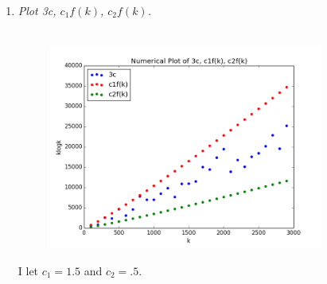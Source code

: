 \documentclass[12pt]{article}
\begin{document}
\begin{enumerate}
\begin{enumerate}
		    \item \textit{Plot 3c, $c_1f(k)$, $c_2f(k)$.}\\
		    \\
		    \begin{figure}[H]
		    \centering
			  \includegraphics[width=9cm]{q3_3d.png}
			  \end{figure}
		    I let $c_1 = 1.5$ and $c_2 = .5$.
		\end{enumerate}


\end{enumerate}
\end{document}
